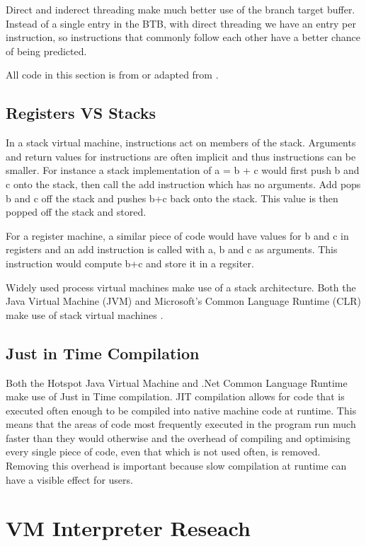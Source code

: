 \documentclass[english,a4paper]{report}
\begin{document}
Direct and inderect threading make much better use of the branch
target buffer. Instead of a single entry in the BTB, with direct
threading we have an entry per instruction, so instructions that
commonly follow each other have a better chance of being predicted.

All code in this section is from or adapted from \cite{Ertl}.


\subsection{Registers VS Stacks}
In a stack virtual machine, instructions act on members of the
stack. Arguments and return values for instructions are often implicit
and thus instructions can be smaller. For instance a stack
implementation of a = b + c would first push b and c onto the stack,
then call the add instruction which has no arguments. Add pops b and c
off the stack and pushes b+c back onto the stack. This value is then
popped off the stack and stored.

For a register machine, a similar piece of code would have values for
b and c in registers and an add instruction is called with a, b and c
as arguments. This instruction would compute b+c and store it in a
regsiter.

Widely used process virtual machines make use of a stack
architecture. Both the Java Virtual Machine (JVM) and Microsoft's
Common Language Runtime (CLR) make use of stack virtual machines
\cite{CLI}\cite{JVM}.

\subsection{Just in Time Compilation}

Both the Hotspot Java Virtual Machine and .Net Common Language 
Runtime make use of Just in Time compilation\cite{JJIT}. JIT 
compilation allows for code that is executed often enough to be
compiled into native machine code at runtime. This means that the 
areas of code most frequently executed in the program run much faster 
than they would otherwise and the overhead of compiling and 
optimising every single piece of code, even that which is not used 
often, is removed. Removing this overhead is important because slow 
compilation at runtime can have a visible effect for users.

\section{VM Interpreter Reseach}
\end{document}
